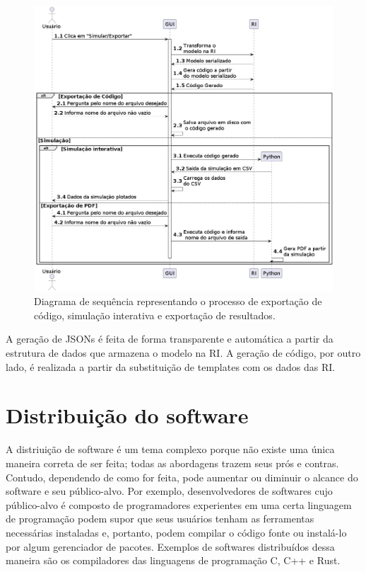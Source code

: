 \documentclass[
	12pt,				%
	openright,			%
	oneside,			%
	a4paper,			%
	main=brazil,
	english,			%
	]{ufsj-abntex2}
\begin{document}
\begin{figure}[h]
    \centering
    \includegraphics[scale=0.42]{diagrams/img/gui-ri.png} 
    \caption{Diagrama de sequência representando o processo de exportação de código, simulação interativa e exportação de resultados.}
    \label{fig:gui-ri}
\end{figure}

A geração de JSONs é feita de forma transparente e automática a partir da estrutura de dados que armazena o modelo na RI. A geração de código, por outro lado, é realizada a partir da substituição de templates com os dados das RI.

\section{Distribuição do software}
\label{sec:distribuicao}

A distriuição de software é um tema complexo porque não existe uma única maneira correta de ser feita; todas as abordagens trazem seus prós e contras. Contudo, dependendo de como for feita, pode aumentar ou diminuir o alcance do software e seu público-alvo. Por exemplo, desenvolvedores de softwares cujo público-alvo é composto de programadores experientes em uma certa linguagem de programação podem supor que seus usuários tenham as ferramentas necessárias instaladas e, portanto, podem compilar o código fonte ou instalá-lo por algum gerenciador de pacotes. Exemplos de softwares distribuídos dessa maneira são os compiladores das linguagens de programação C, C++ e Rust.
\end{document}
